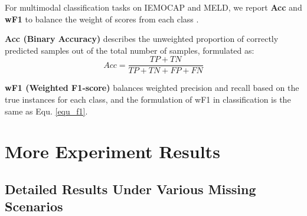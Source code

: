 \documentclass{article}
\begin{document}
For multimodal classification tasks on IEMOCAP and MELD, we report \textbf{Acc} and \textbf{wF1} to balance the weight of scores from each class \cite{geetha2024multimodal}.

\textbf{Acc (Binary Accuracy)} describes the unweighted proportion of correctly predicted samples out of the total number of samples, formulated as:
\begin{equation}
Acc=\frac{TP+TN}{TP +TN + FP + FN}
\end{equation}

\textbf{wF1 (Weighted F1‐score)} balances weighted precision and recall based on the true instances for each class, and the formulation of wF1 in classification is the same as Equ. \ref{equ_f1}.

\section{More Experiment Results} 
\label{appendix_more_result}


\subsection{Detailed Results Under Various Missing Scenarios}
\label{appendix_details_result}
\end{document}
